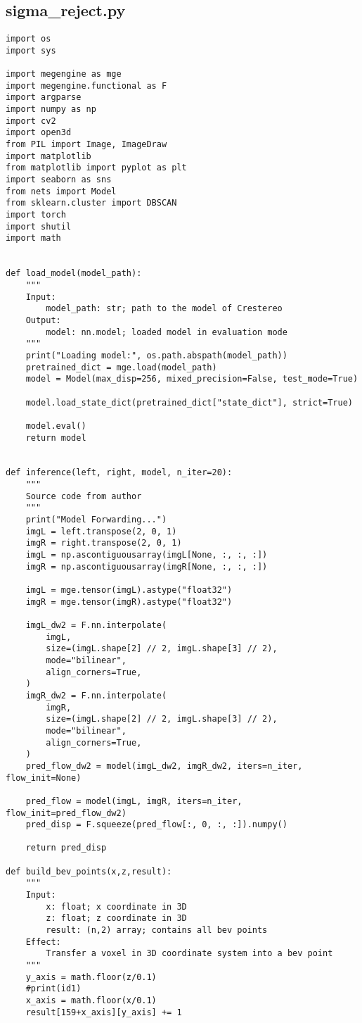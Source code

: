 \subsection*{sigma_reject.py}
\begin{lstlisting}
import os
import sys

import megengine as mge
import megengine.functional as F
import argparse
import numpy as np
import cv2
import open3d
from PIL import Image, ImageDraw
import matplotlib
from matplotlib import pyplot as plt
import seaborn as sns
from nets import Model
from sklearn.cluster import DBSCAN
import torch
import shutil
import math


def load_model(model_path):
    """
    Input:
        model_path: str; path to the model of Crestereo
    Output:
        model: nn.model; loaded model in evaluation mode
    """
    print("Loading model:", os.path.abspath(model_path))
    pretrained_dict = mge.load(model_path)
    model = Model(max_disp=256, mixed_precision=False, test_mode=True)

    model.load_state_dict(pretrained_dict["state_dict"], strict=True)

    model.eval()
    return model


def inference(left, right, model, n_iter=20):
    """
    Source code from author
    """
    print("Model Forwarding...")
    imgL = left.transpose(2, 0, 1)
    imgR = right.transpose(2, 0, 1)
    imgL = np.ascontiguousarray(imgL[None, :, :, :])
    imgR = np.ascontiguousarray(imgR[None, :, :, :])

    imgL = mge.tensor(imgL).astype("float32")
    imgR = mge.tensor(imgR).astype("float32")

    imgL_dw2 = F.nn.interpolate(
        imgL,
        size=(imgL.shape[2] // 2, imgL.shape[3] // 2),
        mode="bilinear",
        align_corners=True,
    )
    imgR_dw2 = F.nn.interpolate(
        imgR,
        size=(imgL.shape[2] // 2, imgL.shape[3] // 2),
        mode="bilinear",
        align_corners=True,
    )
    pred_flow_dw2 = model(imgL_dw2, imgR_dw2, iters=n_iter, flow_init=None)

    pred_flow = model(imgL, imgR, iters=n_iter, flow_init=pred_flow_dw2)
    pred_disp = F.squeeze(pred_flow[:, 0, :, :]).numpy()

    return pred_disp

def build_bev_points(x,z,result):
    """
    Input:
        x: float; x coordinate in 3D
        z: float; z coordinate in 3D
        result: (n,2) array; contains all bev points
    Effect:
        Transfer a voxel in 3D coordinate system into a bev point
    """
    y_axis = math.floor(z/0.1)
    #print(id1)
    x_axis = math.floor(x/0.1)
    result[159+x_axis][y_axis] += 1


\end{lstlisting}
